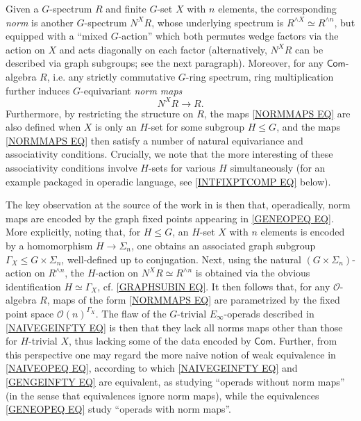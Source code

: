 \documentclass[a4paper,10pt
,draft
]{article}%
\numberwithin{equation}{section}
\numberwithin{figure}{section}
\theoremstyle{definition} %
\newcommand{\1}{\ensuremath{\mathbbm 1}}%
\begin{document}
Given a $G$-spectrum $R$ and finite $G$-set $X$ with $n$ elements, 
the corresponding \textit{norm} is another $G$-spectrum $N^X \! R$,
whose underlying spectrum is 
$R^{\wedge X} \simeq R^{\wedge n}$,
but equipped with a ``mixed $G$-action''
which both permutes wedge factors via the action on $X$ 
and acts diagonally on each factor
(alternatively, $N^X \! R$ can be described via graph subgroups; see the next paragraph).
Moreover, for any $\mathsf{Com}$-algebra $R$, i.e.
any strictly commutative $G$-ring spectrum, 
ring multiplication further induces
$G$-equivariant \textit{norm maps}
\begin{equation}\label{NORMMAPS EQ}
	N^X \! R \to R.
\end{equation}
Furthermore, by restricting the structure on $R$,
the maps \eqref{NORMMAPS EQ} are also defined when $X$ is only an $H$-set for some subgroup $H \leq G$, and the maps \eqref{NORMMAPS EQ}
then satisfy a number of 
natural equivariance and associativity conditions.
Crucially,  we note that the more interesting of these associativity conditions involve $H$-sets for various $H$ simultaneously
(for an example packaged in operadic language,
see \eqref{INTFIXPTCOMP EQ} below).

The key observation at the source of the work in 
\cite{BH15} is then that, operadically, 
norm maps are encoded by the graph fixed points 
appearing in \eqref{GENEOPEQ EQ}.
More explicitly, noting that, for $H \leq G$, an $H$-set $X$ with $n$ elements 
is encoded by a
homomorphism 
$H \to \Sigma_n$,
one obtains an associated graph subgroup
$\Gamma_X \leq G \times \Sigma_n$,
well-defined up to conjugation. 
Next,
using the natural 
$(G \times \Sigma_n)$-action on $R^{\wedge n}$,
the $H$-action on $N^X \! R \simeq R^{\wedge n}$
is obtained via the obvious identification
$H \simeq \Gamma_X$, cf. \eqref{GRAPHSUBIN EQ}.
%
It then follows that,
for any $\mathcal{O}$-algebra $R$,
maps of the form \eqref{NORMMAPS EQ}
are parametrized by the fixed point space
$\mathcal{O}(n)^{\Gamma_X}$.
The flaw of the $G$-trivial $E_{\infty}$-operads
described in \eqref{NAIVEGEINFTY EQ} is then that
they lack all norms maps other than those for $H$-trivial $X$, thus lacking 
some of the data encoded by $\mathsf{Com}$.
Further, from this perspective one may regard the more naive notion of weak equivalence in \eqref{NAIVEOPEQ EQ},
according to which \eqref{NAIVEGEINFTY EQ} and \eqref{GENGEINFTY EQ} are equivalent,
as studying ``operads without norm maps''
(in the sense that equivalences ignore norm maps), 
while the equivalences \eqref{GENEOPEQ EQ}
study ``operads with norm maps''.
\end{document}
